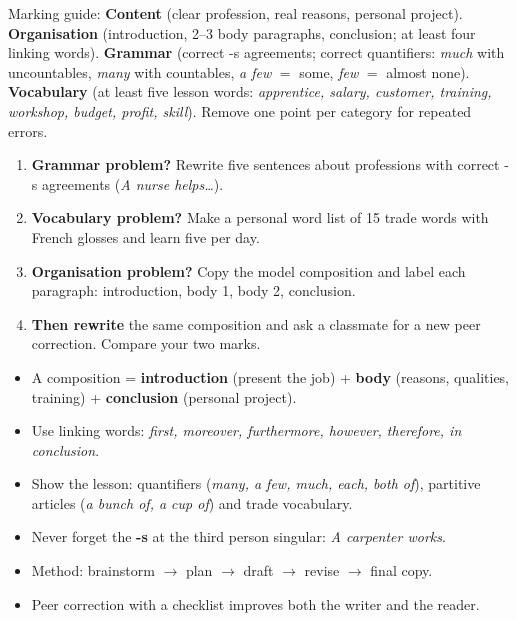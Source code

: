 \documentclass[11pt]{article}
\begin{document}
\begin{corrige}
Marking guide: \textbf{Content} (clear profession, real reasons, personal project). \textbf{Organisation} (introduction, 2--3 body paragraphs, conclusion; at least four linking words). \textbf{Grammar} (correct -s agreements; correct quantifiers: \emph{much} with uncountables, \emph{many} with countables, \emph{a few} $=$ some, \emph{few} $=$ almost none). \textbf{Vocabulary} (at least five lesson words: \emph{apprentice, salary, customer, training, workshop, budget, profit, skill}). Remove one point per category for repeated errors.
\end{corrige}

\begin{methode}
\begin{enumerate}
\item \textbf{Grammar problem?} Rewrite five sentences about professions with correct -s agreements (\emph{A nurse helps\ldots}).
\item \textbf{Vocabulary problem?} Make a personal word list of 15 trade words with French glosses and learn five per day.
\item \textbf{Organisation problem?} Copy the model composition and label each paragraph: introduction, body 1, body 2, conclusion.
\item \textbf{Then rewrite} the same composition and ask a classmate for a new peer correction. Compare your two marks.
\end{enumerate}
\end{methode}

\begin{aretenir}
\begin{itemize}
\item A composition = \textbf{introduction} (present the job) + \textbf{body} (reasons, qualities, training) + \textbf{conclusion} (personal project).
\item Use linking words: \emph{first, moreover, furthermore, however, therefore, in conclusion}.
\item Show the lesson: quantifiers (\emph{many, a few, much, each, both of}), partitive articles (\emph{a bunch of, a cup of}) and trade vocabulary.
\item Never forget the \textbf{-s} at the third person singular: \emph{A carpenter works}.
\item Method: brainstorm $\rightarrow$ plan $\rightarrow$ draft $\rightarrow$ revise $\rightarrow$ final copy.
\item Peer correction with a checklist improves both the writer and the reader.
\end{itemize}
\end{aretenir}
\end{document}
